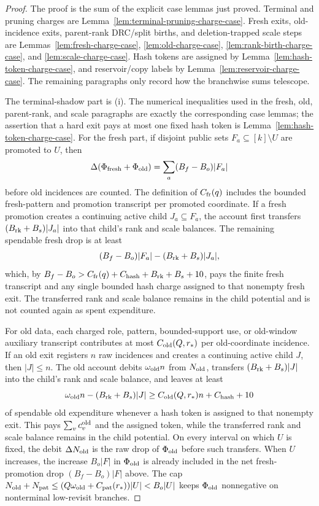 \documentclass[11pt]{article}
\begin{document}
\begin{proof}
The proof is the sum of the explicit case lemmas just proved.  Terminal and
pruning charges are Lemma~\ref{lem:terminal-pruning-charge-case}.  Fresh exits,
old-incidence exits, parent-rank DRC/split births, and deletion-trapped scale
steps are Lemmas~\ref{lem:fresh-charge-case}, \ref{lem:old-charge-case},
\ref{lem:rank-birth-charge-case}, and \ref{lem:scale-charge-case}.  Hash tokens
are assigned by Lemma~\ref{lem:hash-token-charge-case}, and reservoir/copy
labels by Lemma~\ref{lem:reservoir-charge-case}.  The remaining paragraphs only
record how the branchwise sums telescope.

The terminal-shadow part is (i).  The numerical inequalities used in the fresh,
old, parent-rank, and scale paragraphs are exactly the corresponding case
lemmas; the assertion that a hard exit pays at most one fixed hash token is
Lemma~\ref{lem:hash-token-charge-case}.
For the fresh part, if disjoint public sets
$F_a\subseteq [k]\setminus U$ are promoted to $U$, then
\[
  \Delta(\Phi_{\rm fresh}+\Phi_{\rm old})
  =
  \sum_a (B_f-B_o)|F_a|
\]
before old incidences are counted.  The definition of $C_{\rm fr}(q)$ includes
the bounded fresh-pattern and promotion transcript per promoted coordinate.
If a fresh promotion creates a continuing active child $J_a\subseteq F_a$,
the account first transfers $(B_{\rm rk}+B_s)|J_a|$ into that child's
rank and scale balances.  The
remaining spendable fresh drop is at least
\[
  (B_f-B_o)|F_a|-(B_{\rm rk}+B_s)|J_a|,
\]
which, by $B_f-B_o>C_{\rm fr}(q)+C_{\rm hash}+B_{\rm rk}+B_s+10$, pays the finite
fresh transcript and any single bounded hash charge assigned to that nonempty
fresh exit.  The transferred rank and scale balance remains in the child
potential and is not counted again as spent expenditure.

For old data, each charged role, pattern, bounded-support use, or old-window
auxiliary transcript contributes at most $C_{\rm old}(Q,r_*)$ per
old-coordinate incidence.  If an old exit registers $n$ raw incidences and
creates a continuing active child $J$, then $|J|\le n$.  The old account debits
$\omega_{\rm old}n$ from $N_{\rm old}$, transfers
$(B_{\rm rk}+B_s)|J|$ into the child's rank and
scale balance, and leaves at least
\[
  \omega_{\rm old}n-(B_{\rm rk}+B_s)|J|
  \ge C_{\rm old}(Q,r_*)n+C_{\rm hash}+10
\]
of spendable old expenditure whenever a hash token is assigned to that
nonempty exit.  This pays $\sum_v c_v^{\rm old}$ and the assigned token, while
the transferred rank and scale balance remains in the child potential.  On every
interval on which $U$ is fixed, the debit $\Delta N_{\rm old}$ is the raw drop
of $\Phi_{\rm old}$ before such transfers.  When $U$ increases, the increase
$B_o|F|$ in
$\Phi_{\rm old}$ is already included in the net fresh-promotion drop
$(B_f-B_o)|F|$ above.
The cap
$N_{\rm old}+N_{\rm pat}
\le (Q\omega_{\rm old}+C_{\rm pat}(r_*))|U|<B_o|U|$
keeps $\Phi_{\rm old}$ nonnegative on nonterminal low-revisit branches.


\end{proof}
\end{document}
